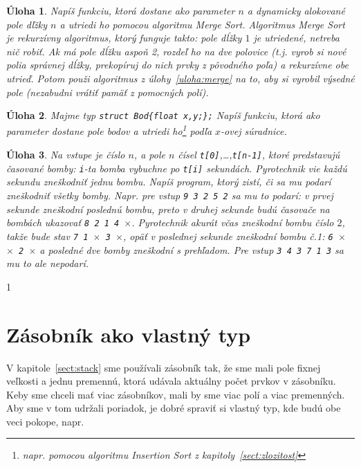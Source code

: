 \documentclass[10pt]{article}
\def\prg{\lstinline}
\newtheorem{uloha}{Úloha}
\def\sectxix{1} %
\def\sectxix{0} %
\begin{document}
\begin{uloha}
  \label{uloha:mergesort}
  Napíš funkciu, ktorá dostane ako parameter $n$ a dynamicky alokované pole
  dľžky $n$ a utriedi ho pomocou algoritmu {\em Merge Sort}. Algoritmus {\em Merge
  Sort} je rekurzívny algoritmus, ktorý funguje takto: pole dĺžky $1$ je utriedené,
  netreba nič robiť. Ak má pole dĺžku aspoň 2, rozdeľ ho na dve polovice (t.j.
  vyrob si nové polia správnej dĺžky, prekopíruj do nich prvky z pôvodného poľa)
  a rekurzívne obe utrieď. Potom použi algoritmus z úlohy~\ref{uloha:merge} na to,
  aby si vyrobil výsedné pole (nezabudni vrátiť pamäť z pomocných polí).
\end{uloha}

\begin{uloha}
  \label{uloha:sortbody}
  Majme typ \prg!struct Bod{float x,y;};! Napíš funkciu, ktorá ako parameter
  dostane pole bodov a utriedi ho\footnote{napr. pomocou algoritmu {\em Insertion Sort}
  z kapitoly~\ref{sect:zlozitost}} podľa $x$-ovej súradnice.
\end{uloha}

\begin{uloha}
  Na vstupe je číslo $n$, a pole $n$ čísel {\tt t[0]},\ldots,{\tt t[n-1]}, ktoré 
  predstavujú časované bomby: {\tt i}-ta bomba vybuchne po {\tt t[i]} sekundách.
  Pyrotechnik vie každú sekundu zneškodniť jednu bombu. Napíš program, ktorý
  zistí, či sa mu podarí zneškodniť všetky bomby. Napr. pre vstup {\tt 9 3 2 5 2} 
  sa mu to podarí: v prvej sekunde zneškodní poslednú bombu, preto v druhej sekunde
  budú časovače na bombách ukazovať {\tt 8 2 1 4 $\times$}. Pyrotechnik akurát včas zneškodní
  bombu číslo $2$, takže bude stav {\tt 7 1 $\times$ 3 $\times$}, opäť v poslednej
  sekunde zneškodní bombu č.1: {\tt 6 $\times$ $\times$ 2 $\times$} a posledné dve bomby
  zneškodní s prehľadom. Pre vstup {\tt 3 4 3 7 1 3} sa mu to ale nepodarí.
\end{uloha}

\fi

\if\sectxix1
\section{Zásobník ako vlastný typ}

V kapitole~\ref{sect:stack} sme používali zásobník tak, že sme mali pole fixnej
veľkosti a jednu premennú, ktorá udávala aktuálny počet prvkov v zásobníku. Keby sme chceli
mať viac zásobníkov, mali by sme viac polí a viac premenných. Aby sme v tom udržali
poriadok, je dobré spraviť si vlastný typ, kde budú obe veci pokope, napr.
\end{document}
